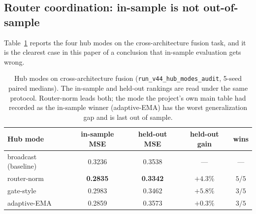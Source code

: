 \documentclass[10pt,twoside]{article}
\theoremstyle{definition}
\theoremstyle{plain}
\theoremstyle{remark}
\begin{document}
\subsection{Router coordination: in-sample is not out-of-sample}
\label{sec:hub-exp}

Table~\ref{tab:hub} reports the four hub modes on the cross-architecture fusion task, and it is the clearest case in this paper of a conclusion that in-sample evaluation gets wrong.

\begin{table}[htbp]
\centering
\caption{Hub modes on cross-architecture fusion (\texttt{run\_v44\_hub\_modes\_audit}, 5-seed paired medians). The in-sample and held-out rankings are read under the same protocol. Router-norm leads both; the mode the project's own main table had recorded as the in-sample winner (adaptive-EMA) has the worst generalization gap and is last out of sample.}
\label{tab:hub}
\small
\setlength{\tabcolsep}{5pt}
\begin{tabular}{lcccc}
\toprule
\textbf{Hub mode} & \textbf{in-sample MSE} & \textbf{held-out MSE} & \textbf{held-out gain} & \textbf{wins} \\
\midrule
broadcast (baseline) & 0.3236 & 0.3538 & --- & --- \\
router-norm & \textbf{0.2835} & \textbf{0.3342} & $+4.3\%$ & $5/5$ \\
gate-style & 0.2983 & 0.3462 & $+5.8\%$ & $3/5$ \\
adaptive-EMA & 0.2859 & 0.3573 & $+0.3\%$ & $3/5$ \\
\bottomrule
\end{tabular}
\end{table}
\end{document}

